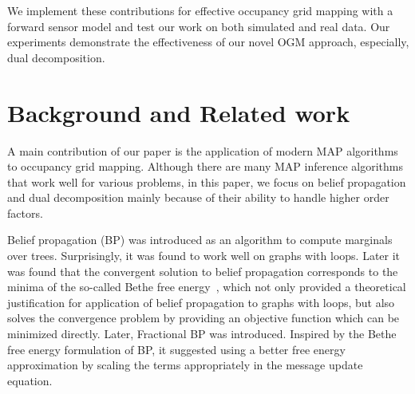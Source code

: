 \documentclass[letterpaper, 10 pt, conference]{ieeeconf} %
\begin{document}
We implement these contributions for effective occupancy grid mapping with a 
forward sensor model and test our work on both simulated and real data. Our 
experiments demonstrate the effectiveness of our novel OGM approach, especially, 
dual decomposition.  


\section{Background and Related work} 
\label{sec:related}

%

A main contribution of our paper is the application of modern MAP algorithms to 
occupancy grid mapping. Although there are many MAP inference algorithms 
\cite{kappes2013comparative} that work well for various problems, in this paper, 
we focus on belief propagation \cite{kschischang2001factor} and dual 
decomposition \cite{sontag2011introduction} mainly because of their ability to 
handle higher order factors. %

Belief propagation (BP) \cite{pearl1986fusion} was introduced as an algorithm to 
compute marginals over trees.  Surprisingly, it was found to work well on graphs 
with loops. Later it was found 
that the convergent solution to belief propagation corresponds to the minima of 
the so-called Bethe free energy~\cite{yedidia2000generalized}, which not only 
provided a theoretical justification for application of belief propagation to 
graphs with loops, but also solves the convergence problem by providing an 
objective function which can be minimized directly.  Later, Fractional BP
\cite{wiegerinck2003fractional} was introduced. Inspired by the Bethe free
energy formulation of BP, it suggested using a better free energy
approximation by scaling the terms appropriately in the message update
equation.  
\end{document}
